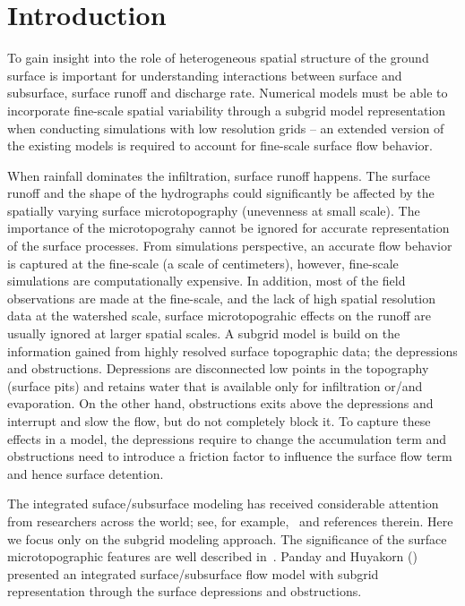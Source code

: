 \documentclass[review,11pt]{elsarticle}
\begin{document}
\linenumbers

\section{Introduction}\label{introduction}
To gain insight into the role of heterogeneous spatial structure of the ground surface is important for understanding interactions between surface and subsurface, surface runoff and discharge rate. Numerical models must be able to incorporate fine-scale spatial variability through a subgrid model representation when conducting simulations with low resolution grids -- an extended version of the existing models is required to account for fine-scale surface flow behavior. 

When rainfall dominates the infiltration, surface runoff happens. The surface runoff and the shape of the hydrographs could significantly be affected by the spatially varying surface microtopography (unevenness at small scale). The importance of the microtopograhy  cannot be ignored for accurate representation of the surface processes. From simulations perspective, an accurate flow behavior is captured at the fine-scale (a scale of centimeters), however, fine-scale simulations are computationally expensive. In addition, most of the field observations are made at the fine-scale, and the lack of high spatial resolution data at the watershed scale, surface microtopograhic effects on the runoff are usually ignored at larger spatial scales. A subgrid model is build on the information gained from highly resolved surface topographic data; the depressions and obstructions. Depressions are disconnected low points in the topography (surface pits) and retains water that is available only for infiltration or/and evaporation. On the other hand, obstructions exits above the depressions and interrupt and slow the flow, but do not completely block it. To capture these effects in a model, the depressions require to change the accumulation term and obstructions need to introduce a friction factor to influence the surface flow term and hence surface detention.

The integrated suface/subsurface modeling has received considerable attention from researchers across the world; see, for example,~\cite{painter2013modeling,kurylyk2014climate,spainter2016integrated} and references therein. Here we focus only on the subgrid modeling approach. 
The significance of the surface microtopographic features are well described in~\cite{stammers1956effect}. Panday and Huyakorn (\citeyear{panday2004fully}) presented an integrated surface/subsurface flow model with subgrid representation through the surface depressions and obstructions.
\end{document}

